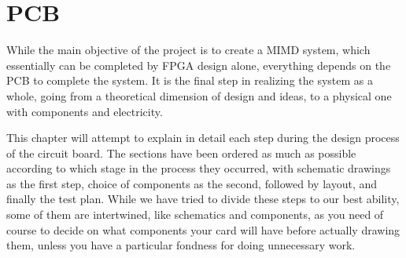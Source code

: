 \chapter{PCB}\label{chapter:pcb}

While the main objective of the project is to create a MIMD system, which essentially can be completed by FPGA design alone, everything depends on the PCB to complete the system. It is the final step in realizing the system as a whole, going from a theoretical dimension of design and ideas, to a physical one with components and electricity.

This chapter will attempt to explain in detail each step during the design process of the circuit board. The sections have been ordered as much as possible according to which stage in the process they occurred, with schematic drawings as the first step, choice of components as the second, followed by layout, and finally the test plan. While we have tried to divide these steps to our best ability, some of them are intertwined, like schematics and components, as you need of course to decide on what components your card will have before actually drawing them, unless you have a particular fondness for doing unnecessary work.






